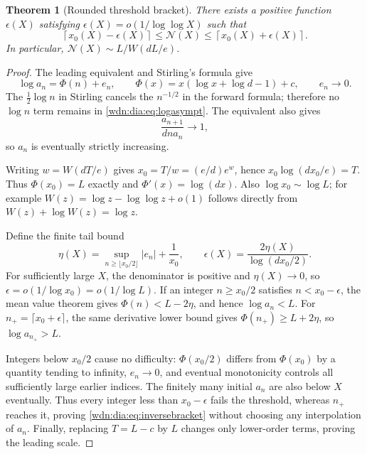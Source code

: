 \documentclass[11pt,letterpaper]{article}
\newtheorem{theorem}{Theorem}[section]
\theoremstyle{remark}\newtheorem{remark}[theorem]{Remark}
\begin{document}
\begin{theorem}[Rounded threshold bracket]\label{wdn:dia:thm:inverse}
There exists a positive function $\epsilon(X)$ satisfying
$\epsilon(X)=o(1/\log\log X)$ such that
\begin{equation}\label{wdn:dia:eq:inversebracket}
 \left\lceil x_0(X)-\epsilon(X)\right\rceil
 \le\mathcal N(X)\le
 \left\lceil x_0(X)+\epsilon(X)\right\rceil.
\end{equation}
In particular, $\mathcal N(X)\sim L/W(dL/e)$.
\end{theorem}
\begin{proof}
The leading equivalent and Stirling's formula give
\begin{equation}\label{wdn:dia:eq:logasympt}
 \log a_n=\Phi(n)+e_n,\qquad
 \Phi(x)=x(\log x+\log d-1)+c,\qquad e_n\longrightarrow0.
\end{equation}
The $\tfrac12\log n$ in Stirling cancels the $n^{-1/2}$ in the forward
formula; therefore no $\log n$ term remains in \eqref{wdn:dia:eq:logasympt}.
The equivalent also gives
\[
 \frac{a_{n+1}}{d n a_n}\longrightarrow1,
\]
so $a_n$ is eventually strictly increasing.

Writing $w=W(dT/e)$ gives $x_0=T/w=(e/d)e^w$, hence
$x_0\log(dx_0/e)=T$. Thus $\Phi(x_0)=L$ exactly and
$\Phi'(x)=\log(dx)$. Also $\log x_0\sim\log L$; for example
$W(z)=\log z-\log\log z+o(1)$ follows directly from
$W(z)+\log W(z)=\log z$.

Define the finite tail bound
\[
 \eta(X)=\sup_{n\ge\lfloor x_0/2\rfloor}|e_n|+\frac1{x_0},\qquad
 \epsilon(X)=\frac{2\eta(X)}{\log(dx_0/2)}.
\]
For sufficiently large $X$, the denominator is positive and $\eta(X)\to0$,
so $\epsilon=o(1/\log x_0)=o(1/\log L)$. If an integer
$n\ge x_0/2$ satisfies $n<x_0-\epsilon$, the mean value theorem gives
$\Phi(n)<L-2\eta$, and hence $\log a_n<L$. For
$n_+=\lceil x_0+\epsilon\rceil$, the same derivative lower bound gives
$\Phi(n_+)\ge L+2\eta$, so $\log a_{n_+}>L$.

Integers below $x_0/2$ cause no difficulty: $\Phi(x_0/2)$ differs from
$\Phi(x_0)$ by a quantity tending to infinity, $e_n\to0$, and eventual
monotonicity controls all sufficiently large earlier indices. The finitely
many initial $a_n$ are also below $X$ eventually. Thus every integer less
than $x_0-\epsilon$ fails the threshold, whereas $n_+$ reaches it, proving
\eqref{wdn:dia:eq:inversebracket} without choosing any interpolation of $a_n$.
Finally, replacing $T=L-c$ by $L$ changes only lower-order terms, proving
the leading scale.
\end{proof}
\end{document}

